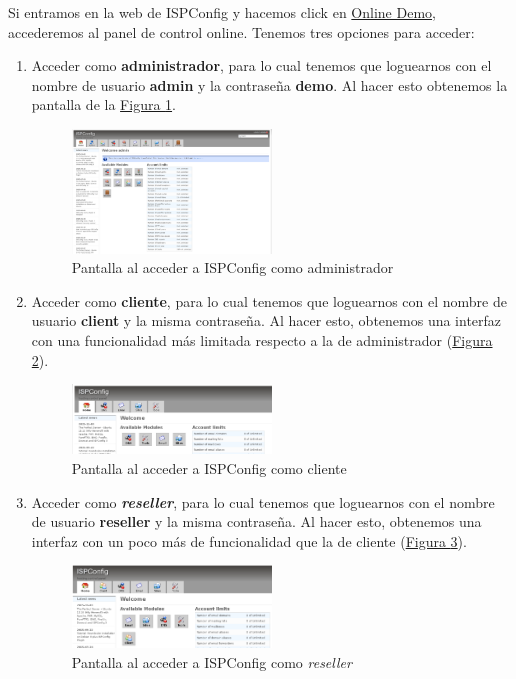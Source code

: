 \documentclass[10pt,a4paper,spanish]{article}
\numberwithin{equation}{section} %
\numberwithin{figure}{section} %
\numberwithin{table}{section} %
\begin{document}
Si entramos en la web de ISPConfig y hacemos click en \href{http://www.ISPConfig.org/page/en/ISPConfig/online-demo.html}{Online Demo}, accederemos al panel de control online. Tenemos tres opciones para acceder:
\begin{enumerate}[$\bullet$]
    \item Acceder como \textbf{administrador}, para lo cual tenemos que loguearnos con el nombre de usuario \textbf{admin} y la contraseña \textbf{demo}. Al hacer esto obtenemos la pantalla de la \hyperref[admin]{Figura \ref*{admin}}.

    \begin{figure}[!h]
        \centering
        \includegraphics[width=0.5\textwidth]{37}
        \caption{Pantalla al acceder a ISPConfig como administrador}
        \label{admin}
    \end{figure}

    \item Acceder como \textbf{cliente}, para lo cual tenemos que loguearnos con el nombre de usuario \textbf{client} y la misma contraseña. Al hacer esto, obtenemos una interfaz con una funcionalidad más limitada respecto a la de administrador (\hyperref[client]{Figura \ref*{client}}).

    \begin{figure}[!h]
        \centering
        \includegraphics[width=0.5\textwidth]{38}
        \caption{Pantalla al acceder a ISPConfig como cliente}
        \label{client}
    \end{figure}

    \item Acceder como \textbf{\textit{reseller}}, para lo cual tenemos que loguearnos con el nombre de usuario \textbf{reseller} y la misma contraseña. Al hacer esto, obtenemos una interfaz con un poco más de funcionalidad que la de cliente (\hyperref[reseller]{Figura \ref*{reseller}}).

    \begin{figure}[!h]
        \centering
        \includegraphics[width=0.5\textwidth]{39}
        \caption{Pantalla al acceder a ISPConfig como \textit{reseller}}
        \label{reseller}
    \end{figure}
\end{enumerate}
\end{document}
